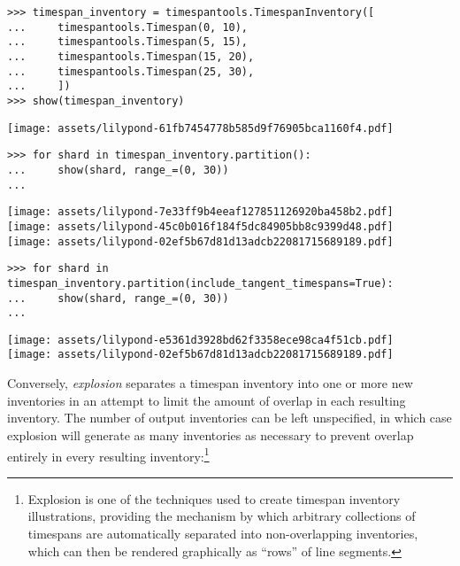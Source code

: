 \begin{abjadbookoutput}
\begin{singlespacing}
\vspace{-0.5\baselineskip}
\begin{verbatim}
>>> timespan_inventory = timespantools.TimespanInventory([
...     timespantools.Timespan(0, 10),
...     timespantools.Timespan(5, 15),
...     timespantools.Timespan(15, 20),
...     timespantools.Timespan(25, 30),
...     ])
>>> show(timespan_inventory)
\end{verbatim}
\noindent\texttt{[image: assets/lilypond-61fb7454778b585d9f76905bca1160f4.pdf]}
\begin{verbatim}
>>> for shard in timespan_inventory.partition():
...     show(shard, range_=(0, 30))
...
\end{verbatim}
\noindent\texttt{[image: assets/lilypond-7e33ff9b4eeaf127851126920ba458b2.pdf]}\\
\noindent\texttt{[image: assets/lilypond-45c0b016f184f5dc84905bb8c9399d48.pdf]}\\
\noindent\texttt{[image: assets/lilypond-02ef5b67d81d13adcb22081715689189.pdf]}
\begin{verbatim}
>>> for shard in timespan_inventory.partition(include_tangent_timespans=True):
...     show(shard, range_=(0, 30))
...
\end{verbatim}
\noindent\texttt{[image: assets/lilypond-e5361d3928bd62f3358ece98ca4f51cb.pdf]}\\
\noindent\texttt{[image: assets/lilypond-02ef5b67d81d13adcb22081715689189.pdf]}
\end{singlespacing}
\end{abjadbookoutput}

\noindent Conversely, \emph{explosion} separates a timespan inventory into one
or more new inventories in an attempt to limit the amount of overlap in each
resulting inventory. The number of output inventories can be left unspecified,
in which case explosion will generate as many inventories as necessary to
prevent overlap entirely in every resulting inventory:\footnote{ Explosion is
one of the techniques used to create timespan inventory illustrations,
providing the mechanism by which arbitrary collections of timespans are
automatically separated into non-overlapping inventories, which can then be
rendered graphically as \enquote{rows} of line segments.}

